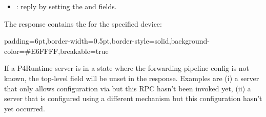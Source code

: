 \documentclass[11pt]{article}
\begin{document}
{\begin{itemize}
\item{}
: reply by setting the  and
 fields.%
\end{itemize}%

\noindent{}The response contains the  for the specified device:%

\begin{mdbmargintb}{6pt}{6pt}%
\begin{mdblock}{padding=6pt,border-width=0.5pt,border-style=solid,background-color=\#E6FFFF,breakable=true}%
\begin{mdpre}%
\end{mdpre}%
\end{mdblock}%
\end{mdbmargintb}%

\noindent{}If a P4Runtime server is in a state where the forwarding-pipeline config is not
known, the top-level  field will be unset in the response. Examples are
(i) a server that only allows configuration via 
but this RPC hasn't been invoked yet, (ii) a server that is configured using a
different mechanism but this configuration hasn't yet occurred.%

}
\end{document}
